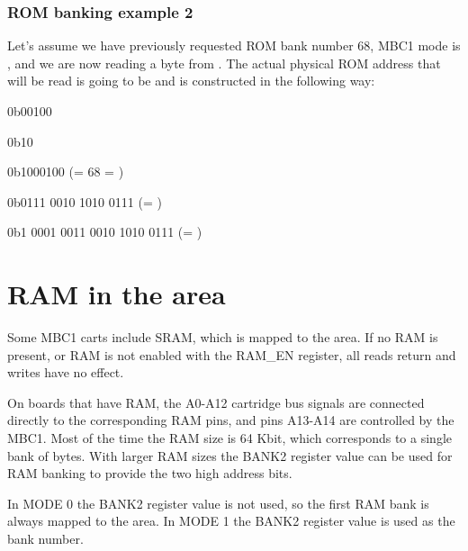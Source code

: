 \subsubsection{ROM banking example 2}

Let's assume we have previously requested ROM bank number 68, MBC1 mode is
, and we are now reading a byte from . The actual
physical ROM address that will be read is going to be  and is
constructed in the following way:

\begin{description}[leftmargin=15em,style=nextline]
  \item[Value of the BANK1 register]
  {
    \ttfamily
    0b\colorbox{blue!30}{00100}
  }
  \item[Value of the BANK2 register]
  {
    \ttfamily
    0b\colorbox{red!30}{10}
  }
  \item[ROM bank number]
  {
    \ttfamily
    0b\colorbox{red!30}{10}\colorbox{blue!30}{00100} (= 68 = )
  }
  \item[Address being read]
  {
    \ttfamily
    0b\colorbox{gray!10}{01}\colorbox{green!30}{11 0010 1010 0111} (= )
  }
  \item[Actual physical ROM address]
  {
    \ttfamily
    0b\colorbox{red!30}{1 0}\colorbox{blue!30}{001 00}\colorbox{green!30}{11 0010 1010 0111} (= )
  }
\end{description}

\section{RAM in the  area}

Some MBC1 carts include SRAM, which is mapped to the 
area. If no RAM is present, or RAM is not enabled with the RAM\_EN register,
all reads return  and writes have no effect.

On boards that have RAM, the A0-A12 cartridge bus signals are connected
directly to the corresponding RAM pins, and pins A13-A14 are controlled by the
MBC1. Most of the time the RAM size is 64 Kbit, which corresponds to a single
bank of  bytes. With larger RAM sizes the BANK2 register value can be
used for RAM banking to provide the two high address bits.

In MODE 0 the BANK2 register value is not used, so the first RAM bank is always
mapped to the  area. In MODE 1 the BANK2 register value is
used as the bank number.

